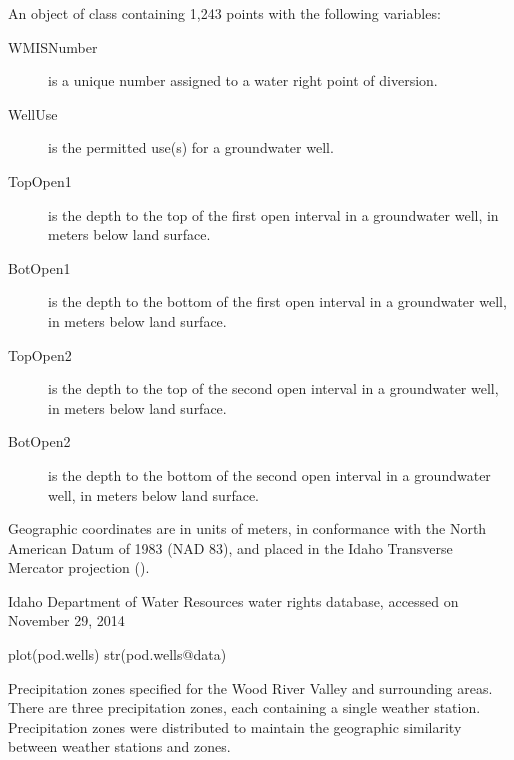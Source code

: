\documentclass[a4paper]{book}
\begin{document}
\begin{Format}
An object of  class containing 1,243 points with the following variables:
\begin{description}

\item[WMISNumber] is a unique number assigned to a water right point of diversion.
\item[WellUse] is the permitted use(s) for a groundwater well.
\item[TopOpen1] is the depth to the top of the first open interval in a groundwater well, in meters below land surface.
\item[BotOpen1] is the depth to the bottom of the first open interval in a groundwater well, in meters below land surface.
\item[TopOpen2] is the depth to the top of the second open interval in a groundwater well, in meters below land surface.
\item[BotOpen2] is the depth to the bottom of the second open interval in a groundwater well, in meters below land surface.

\end{description}

Geographic coordinates are in units of meters, in conformance with the North American Datum of 1983 (NAD 83), and placed in the
Idaho Transverse Mercator projection ().
\end{Format}
%
\begin{Source}\relax
Idaho Department of Water Resources water rights database, accessed on November 29, 2014
\end{Source}
%
\begin{SeeAlso}\relax
{}
\end{SeeAlso}
%
\begin{Examples}
\begin{ExampleCode}
plot(pod.wells)
str(pod.wells@data)
\end{ExampleCode}
\end{Examples}
%
\begin{Description}\relax
Precipitation zones specified for the Wood River Valley and surrounding areas.
There are three precipitation zones, each containing a single weather station.
Precipitation zones were distributed to maintain the geographic similarity between weather stations and zones.
\end{Description}
\end{document}
